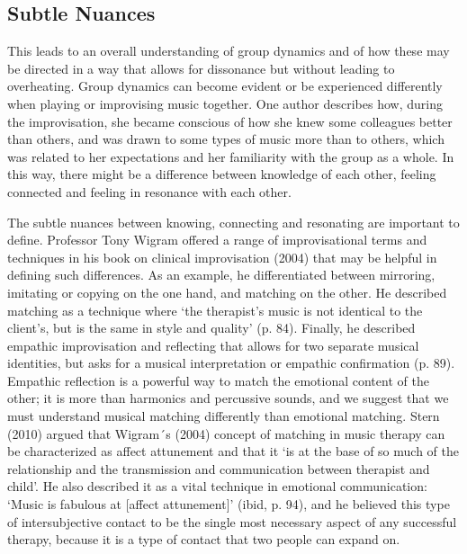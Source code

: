 \begin{adjmulticols}{2}{0mm}{0mm}
\section{Subtle Nuances} 
This leads to an overall understanding of group dynamics and of how these may be directed in a way that allows for dissonance but without leading to overheating. Group dynamics can become evident or be experienced differently when playing or improvising music together. One author describes how, during the improvisation, she became conscious of how she knew some colleagues better than others, and was drawn to some types of music more than to others, which was related to her expectations and her familiarity with the group as a whole. In this way, there might be a difference between knowledge of each other, feeling connected and feeling in resonance with each other.

The subtle nuances between knowing, connecting and resonating are important to define. Professor Tony Wigram offered a range of improvisational terms and techniques in his book on clinical improvisation (2004) that may be helpful in defining such differences. As an example, he differentiated between mirroring, imitating or copying on the one hand, and matching on the other. He described matching as a technique where ‘the therapist’s music is not identical to the client’s, but is the same in style and quality’ (p. 84). Finally, he described empathic improvisation and reflecting that allows for two separate musical identities, but asks for a musical interpretation or empathic confirmation (p. 89). Empathic reflection is a powerful way to match the emotional content of the other; it is more than harmonics and percussive sounds, and we suggest that we must understand musical matching differently than emotional matching. Stern (2010) argued that Wigram´s (2004) concept of matching in music therapy can be characterized as affect attunement and that it ‘is at the base of so much of the relationship and the transmission and communication between therapist and child’. He also described it as a vital technique in emotional communication: ‘Music is fabulous at [affect attunement]’ (ibid, p. 94), and he believed this type of intersubjective contact to be the single most necessary aspect of any successful therapy, because it is a type of contact that two people can expand on.


\end{adjmulticols}
